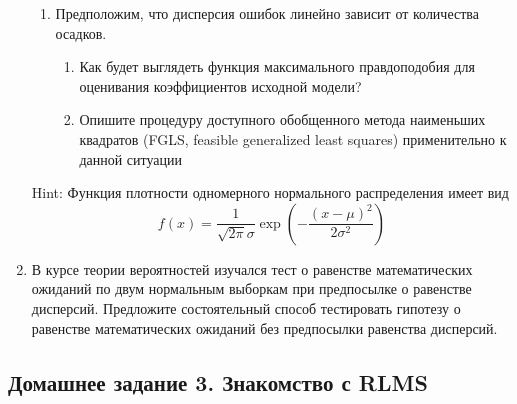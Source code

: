 \documentclass[12pt, a4paper]{article}
\begin{document}
\begin{enumerate}
\begin{enumerate}
\item Предположим, что дисперсия ошибок линейно зависит от количества осадков.
\begin{enumerate}
\item Как будет выглядеть функция максимального правдоподобия для оценивания коэффициентов исходной модели?
\item Опишите процедуру доступного обобщенного метода наименьших квадратов (FGLS, feasible generalized least squares) применительно к данной ситуации
\end{enumerate}
\end{enumerate}
Hint: Функция плотности одномерного нормального распределения имеет вид
\[
f(x)=\frac{1}{\sqrt{2\pi}\sigma}\exp\left(-\frac{(x-\mu)^2}{2\sigma^2}  \right)
\]


\item В курсе теории вероятностей изучался тест о равенстве математических ожиданий по двум нормальным выборкам при предпосылке о равенстве дисперсий. Предложите состоятельный способ тестировать гипотезу о равенстве математических ожиданий без предпосылки равенства дисперсий.


\end{enumerate}

\subsection{Домашнее задание 3. Знакомство с RLMS}
\end{document}
